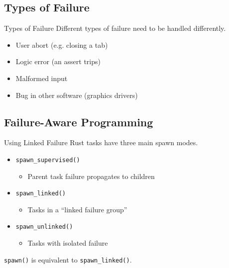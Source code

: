 \documentclass[xcolor=dvipsnames]{beamer}
\begin{document}
\subsection{Types of Failure}


\begin{frame}{Types of Failure}
	Different types of failure need to be handled differently.
	\begin{itemize}
		\item User abort (e.g. closing a tab)
		\item Logic error (an assert trips)
		\item Malformed input
		\item Bug in other software (graphics drivers)
	\end{itemize}
\end{frame}

\subsection{Failure-Aware Programming}

\begin{frame}{Using Linked Failure}
	Rust tasks have three main spawn modes.
	\begin{itemize}
		\item \texttt{spawn\_supervised()}
		\begin{itemize}
			\item Parent task failure propagates to children
		\end{itemize}
		\item \texttt{spawn\_linked()}
		\begin{itemize}
			\item Tasks in a ``linked failure group''
		\end{itemize}
		\item \texttt{spawn\_unlinked()}
		\begin{itemize}
			\item Tasks with isolated failure
		\end{itemize}
	\end{itemize}
	\linegap
	\texttt{spawn()} is equivalent to \texttt{spawn\_linked()}.
\end{frame}
\end{document}
